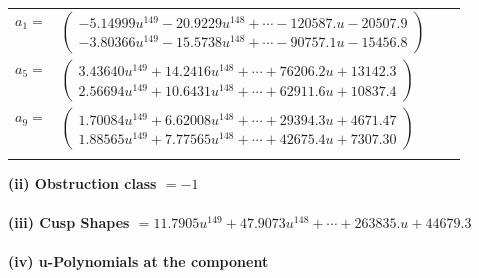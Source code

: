 \documentclass[1p]{elsarticle_modified}
\theoremstyle{definition}
\begin{document}
\begin{tabular}{m{7pt} m{180pt} m{7pt} m{180pt} }
\flushright $a_{1}=$&$\begin{pmatrix}-5.14999 u^{149}-20.9229 u^{148}+\cdots-120587. u-20507.9\\-3.80366 u^{149}-15.5738 u^{148}+\cdots-90757.1 u-15456.8\end{pmatrix}$ \\
\flushright $a_{5}=$&$\begin{pmatrix}3.43640 u^{149}+14.2416 u^{148}+\cdots+76206.2 u+13142.3\\2.56694 u^{149}+10.6431 u^{148}+\cdots+62911.6 u+10837.4\end{pmatrix}$ \\
\flushright $a_{9}=$&$\begin{pmatrix}1.70084 u^{149}+6.62008 u^{148}+\cdots+29394.3 u+4671.47\\1.88565 u^{149}+7.77565 u^{148}+\cdots+42675.4 u+7307.30\end{pmatrix}$\\&\end{tabular}
\flushleft \textbf{(ii) Obstruction class $= -1$}\\~\\
\flushleft \textbf{(iii) Cusp Shapes $= 11.7905 u^{149}+47.9073 u^{148}+\cdots+263835. u+44679.3$}\\~\\
\newpage\renewcommand{\arraystretch}{1}
\flushleft \textbf{(iv) u-Polynomials at the component}\newline \\
\end{document}
